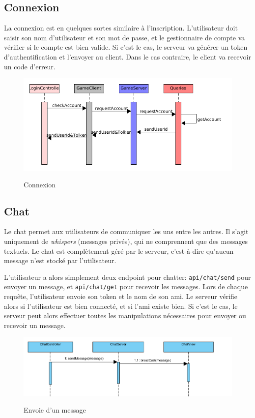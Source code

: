 \documentclass[../design_fonctionnement_sys.tex]{subfiles}
\begin{document}
\subsection{Connexion}
La connexion est en quelques sortes similaire à l'inscription. L'utilisateur doit saisir son nom d'utilisateur et son mot de passe, et le gestionnaire de compte va vérifier
si le compte est bien valide. Si c'est le cas, le serveur va générer un token d'authentification et l'envoyer au client. Dans le cas contraire,
le client va recevoir un code d'erreur.

\begin{figure}[H]
    \centering
    \includegraphics[scale=0.4]{img_design/login_fonctionnement.png}
    \label{fig:seq_match_client}
    \caption{Connexion}
\end{figure}


\subsection{Chat}
Le chat permet aux utilisateurs de communiquer les uns entre les autres. Il s'agit uniquement de \textit{whispers} (messages privés), qui ne comprennent que des messages textuels.
Le chat est complètement géré par le serveur, c'est-à-dire qu'aucun message n'est stocké par l'utilisateur.

L'utilisateur a alors simplement deux endpoint pour chatter: \texttt{api/chat/send} pour envoyer un message, et \texttt{api/chat/get} pour recevoir les messages.
Lors de chaque requête, l'utilisateur envoie son token et le nom de son ami. Le serveur vérifie alors si l'utilisateur est bien connecté, et si l'ami existe bien.
Si c'est le cas, le serveur peut alors effectuer toutes les manipulations nécessaires pour envoyer ou recevoir un message.

\begin{figure}[H]
    \centering
    \includegraphics[scale=0.3]{img_design/Chat_DS.png}
    \label{fig:seq_match_client}
    \caption{Envoie d'un message}
\end{figure}
\end{document}
